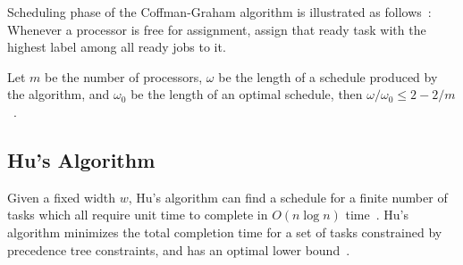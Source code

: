 \documentclass[letterpaper,12pt]{article}
\theoremstyle{definition}
\begin{document}
Scheduling phase of the Coffman-Graham algorithm is illustrated as follows~\cite{leung_basic_2004,coffman_optimal_1972}:
Whenever a processor is free for assignment, assign that ready task with the highest label among all ready jobs to it. 

Let $m$ be the number of processors, $\omega$ be the length of a schedule produced by the algorithm, and $\omega_0$ be the length of an optimal schedule, then $\omega/ \omega_0 \leq 2-2/m$~\cite{coffman_optimal_1972,lam_worst_1977}. 








\subsection{Hu's Algorithm}
Given a fixed width $w$, Hu's algorithm can find a schedule for a finite number of tasks which all require unit time to complete in $O(n\log n)$ time~\cite{leung_basic_2004}. Hu's algorithm minimizes the total completion time for a set of tasks constrained by precedence tree constraints, and has an optimal lower bound~\cite{mchugh_hus_1984}.
\end{document}
